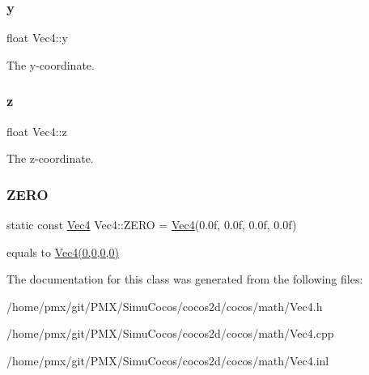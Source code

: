 \subsubsection{\texorpdfstring{y}{y}}
{\footnotesize\ttfamily float Vec4\+::y}

The y-\/coordinate. \mbox{\label{classVec4_a60d0b599c7104dd0c6e2ae0cc4cd0310}} 
\subsubsection{\texorpdfstring{z}{z}}
{\footnotesize\ttfamily float Vec4\+::z}

The z-\/coordinate. \mbox{\label{classVec4_aaa988d97a0789befa6e14f3c9a9675e4}} 
\subsubsection{\texorpdfstring{Z\+E\+RO}{ZERO}}
{\footnotesize\ttfamily static const \hyperlink{classVec4}{Vec4} Vec4\+::\+Z\+E\+RO = \hyperlink{classVec4}{Vec4}(0.\+0f, 0.\+0f, 0.\+0f, 0.\+0f)\hspace{0.3cm}{\ttfamily [static]}}

equals to \hyperlink{classVec4}{Vec4(0,0,0,0)} 

The documentation for this class was generated from the following files\+:\begin{DoxyCompactItemize}
\item 
/home/pmx/git/\+P\+M\+X/\+Simu\+Cocos/cocos2d/cocos/math/Vec4.\+h\item 
/home/pmx/git/\+P\+M\+X/\+Simu\+Cocos/cocos2d/cocos/math/Vec4.\+cpp\item 
/home/pmx/git/\+P\+M\+X/\+Simu\+Cocos/cocos2d/cocos/math/Vec4.\+inl\end{DoxyCompactItemize}

